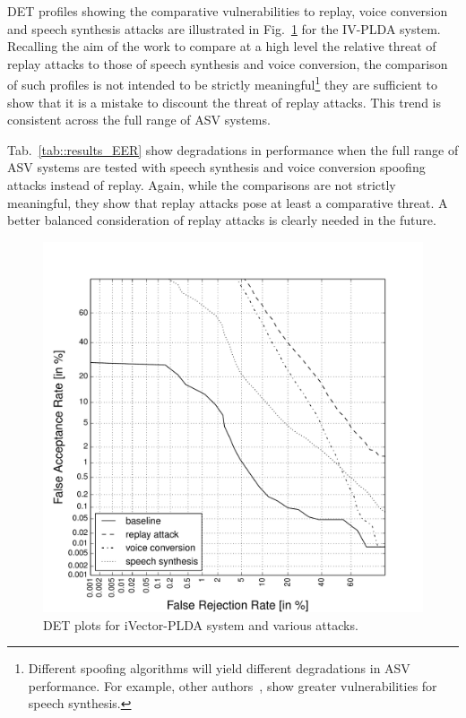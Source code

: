 DET profiles showing the comparative vulnerabilities to replay, voice conversion and speech synthesis attacks are illustrated in Fig.~\ref{fig::DETs_4attacks} for the IV-PLDA system.  Recalling the aim of the work to compare at a high level the relative threat of replay attacks to those of speech synthesis and voice conversion, the comparison of such profiles is not intended to be strictly meaningful\footnote{Different spoofing algorithms will yield different degradations in ASV performance.  For example, other authors~\cite{DeLeon2012,Ergunay2015,Wu2015}, show greater vulnerabilities for speech synthesis.} they are sufficient to show that it is a mistake to discount the threat of replay attacks.  This trend is consistent across the full range of ASV systems.  

Tab.~\ref{tab::results_EER} show degradations in performance when the full range of ASV systems are tested with speech synthesis and voice conversion spoofing attacks instead of replay.  Again, while the comparisons are not strictly meaningful, they show that replay attacks pose at least a comparative threat.  A better balanced consideration of replay attacks is clearly needed in the future.


\begin{figure}[!t]
	\centering
	\includegraphics[width=1\linewidth]{Figs/DETs_IV_ss_vc_rp.pdf}
	\caption{DET plots for iVector-PLDA system and various attacks.}
	\label{fig::DETs_4attacks}
\end{figure}




